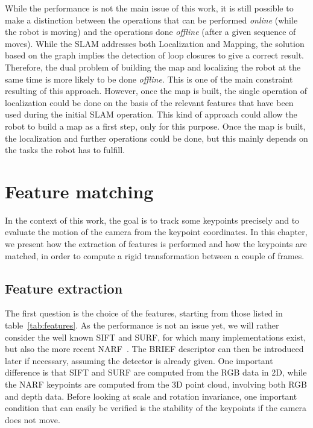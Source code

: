 While the performance is not the main issue of this work, it is still possible to make a distinction between the operations that can be performed \emph{online} (while the robot is moving) and the operations done \emph{offline} (after a given sequence of moves). While the \gls{SLAM} addresses both Localization and Mapping, the solution based on the graph implies the detection of loop closures to give a correct result. Therefore, the dual problem of building the map and localizing the robot at the same time is more likely to be done \emph{offline}. This is one of the main constraint resulting of this approach. However, once the map is built, the single operation of localization could be done on the basis of the relevant features that have been used during the initial \gls{SLAM} operation. This kind of approach could allow the robot to build a map as a first step, only for this purpose. Once the map is built, the localization and further operations could be done, but this mainly depends on the tasks the robot has to fulfill.

\chapter{Feature matching}
\label{chap:features}

In the context of this work, the goal is to track some keypoints precisely and to evaluate the motion of the camera from the keypoint coordinates. In this chapter, we present how the extraction of features is performed and how the keypoints are matched, in order to compute a rigid transformation between a couple of frames.

\section{Feature extraction}

The first question is the choice of the features, starting from those listed in table~\ref{tab:features}. As the performance is not an issue yet, we will rather consider the well known \gls{SIFT} and \gls{SURF}, for which many implementations exist, but also the more recent \gls{NARF}~\cite{steder10irosws}. The \gls{BRIEF} descriptor can then be introduced later if necessary, assuming the detector is already given. One important difference is that \gls{SIFT} and \gls{SURF} are computed from the RGB data in 2D, while the \gls{NARF} keypoints are computed from the 3D point cloud, involving both RGB and depth data. Before looking at scale and rotation invariance, one important condition that can easily be verified is the stability of the keypoints if the camera does not move. 

